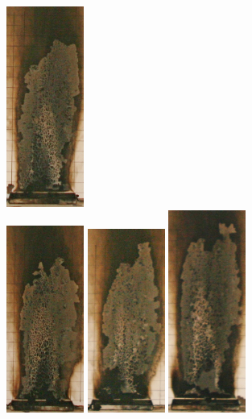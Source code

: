 \documentclass[twoside]{uocthesis}
\begin{document}
{\begin{figure}[p]
	\includegraphics[width=1.0in]{../Figures/GBGAS_08_IMG_5698} \\

	\includegraphics[width=1.0in]{../Figures/GBGAS_09_IMG_5717}
	\includegraphics[width=1.0in]{../Figures/GBGAS_10_IMG_5737}
	\includegraphics[width=1.0in]{../Figures/GBGAS_11_IMG_5756}

\end{figure}}
\end{document}
